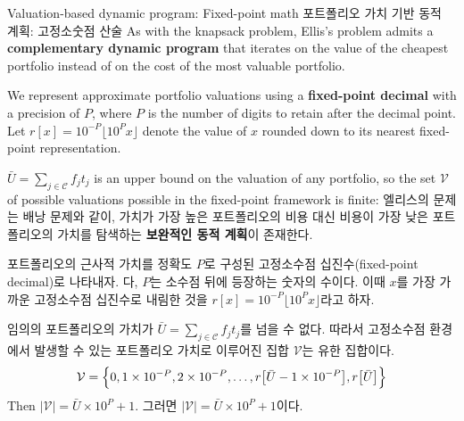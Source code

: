 \documentclass[11pt,mathserif,notheorems]{beamer}
\theoremstyle{definition}
\theoremstyle{definition}
\begin{document}
\begin{frame}{\ifen Valuation-based dynamic program: Fixed-point math \else 포트폴리오 가치 기반 동적 계획: 고정소숫점 산술 \fi}
\ifen 
As with the knapsack problem, Ellis's problem admits a \textbf{complementary dynamic program} that iterates on the value of the cheapest portfolio instead of on the cost of the most valuable portfolio.

We represent approximate portfolio valuations using a \textbf{fixed-point decimal} with a precision of $P$, where $P$ is the number of digits to retain after the decimal point. Let $r[x] =  10^{-P}\lfloor 10^P x \rfloor$ denote the value of $x$ rounded down to its nearest fixed-point representation.

$\bar U = \sum_{j\in \mathcal{C}} f_j t_j$ is an upper bound on the valuation of any portfolio, so the set $\mathcal{V}$ of possible valuations possible in the fixed-point framework is finite:
\else
엘리스의 문제는 배낭 문제와 같이, 가치가 가장 높은 포트폴리오의 비용 대신 비용이 가장 낮은 포트폴리오의 가치를 탐색하는 \textbf{보완적인 동적 계획}이 존재한다. 

포트폴리오의 근사적 가치를 정확도 $P$로 구성된 고정소수점 십진수(fixed-point decimal)로 나타내자. 다, $P$는 소수점 뒤에 등장하는 숫자의 수이다. 이때 $x$를 가장 가까운 고정소수점 십진수로 내림한 것을 $r[x] =  10^{-P}\lfloor 10^P x \rfloor$라고 하자.

임의의 포트폴리오의 가치가 $\bar U = \sum_{j\in \mathcal{C}} f_j t_j$를 넘을 수 없다. 따라서 고정소수점 환경에서 발생할 수 있는 포트폴리오 가치로 이루어진 집합 $\mathcal{V}$는 유한 집합이다.
\fi
\begin{equation*}
\mathcal{V} = \Bigl\{0, 1\times 10^{-P}, 2\times 10^{-P}, \dots, r\bigl[\bar U- 1\times 10^{-P}\bigr], r\bigl[\bar U\bigr]\Bigr\}
\end{equation*}
\ifen Then $|\mathcal{V} | = \bar U \times 10^P + 1$.
\else 그러면 $|\mathcal{V} | = \bar U \times 10^P + 1$이다.\fi

\end{frame}
\end{document}
